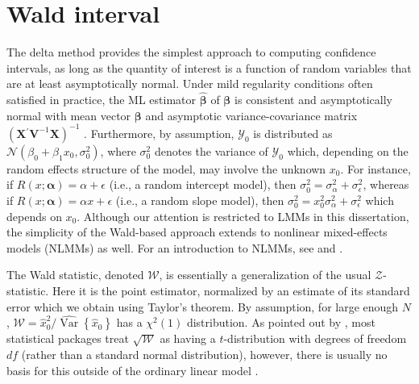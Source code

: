 \documentclass[cmfont,usenames,dvipsnames,leqno]{afit-etd}\usepackage[]{graphicx}\usepackage[]{color}
\newcommand{\trans}{\ensuremath{^\prime}}
\newcommand{\mc}[1]{\ensuremath{\mathcal{#1}}}
\newcommand{\wh}[1]{\ensuremath{\widehat{#1}}}
\newcommand{\var}{\operatorname{Var}}
\newcommand{\X}{\ensuremath{\bm{X}}}
\begin{document}
\section{Wald interval}
\label{sec:calibration-lmm-wald}
The delta method provides the simplest approach to computing confidence intervals, as long as the quantity of interest is a function of random variables that are at least asymptotically normal. Under mild regularity conditions often satisfied in practice, the \ac{ML} estimator $\wh{\bm{\beta}}$ of $\bm{\beta}$ is consistent and asymptotically normal with mean vector $\bm{\beta}$ and asymptotic variance-covariance matrix $\left(\X\trans\bm{V}^{-1}\X\right)^{-1}$ \citep{pinheiro_topics_1994}. Furthermore, by assumption, $\mc{Y}_0$ is distributed as $\mc{N}\left(\beta_0 + \beta_1 x_0, \sigma_0^2\right)$, where $\sigma_0^2$ denotes the variance of $\mc{Y}_0$ which, depending on the random effects structure of the model, may involve the unknown $x_0$. For instance, if $R\left(x; \bm{\alpha}\right) = \alpha + \epsilon$ (i.e., a random intercept model), then $\sigma_0^2 = \sigma_\alpha^2 + \sigma_\epsilon^2$, whereas if $R\left(x; \bm{\alpha}\right) = \alpha x + \epsilon$ (i.e., a random slope model), then $\sigma_0^2 = x_0^2\sigma_\alpha^2 + \sigma_\epsilon^2$ which depends on $x_0$. Although our attention is restricted to LMMs in this dissertation, the simplicity of the Wald-based approach extends to nonlinear mixed-effects models (NLMMs) as well. For an introduction to NLMMs, see \citet{pinheiro_topics_1994} and \citet{pinheiro_mixed_2009}.

The Wald statistic, denoted $\mc{W}$, is essentially a generalization of the usual $\mc{Z}$-statistic. Here it is the point estimator, normalized by an estimate of its standard error which we obtain using Taylor's theorem. By assumption, for large enough $N$, $\mc{W} = \wh{x}_0^2/\wh{\var}\left\{\wh{x}_0\right\}$ has a $\chi^2(1)$ distribution. As pointed out by \citet[p. 184]{harrell_regression_2001}, most statistical packages treat $\sqrt{\mc{W}}$ as having a $t$-distribution  with degrees of freedom $df$ (rather than a standard normal distribution), however, there is usually no basis for this outside of the ordinary linear model \citep{gould_confidence_1993}.
\end{document}
